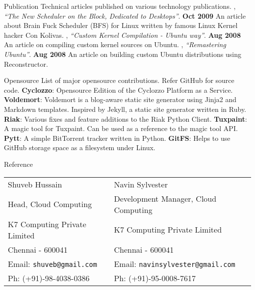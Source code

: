 \documentclass{resume}
\begin{document}

\begin{category}{Publication}
  \citemnobullet Technical articles published on various technology publications.
  , {\em ``The New Scheduler on the Block, Dedicated to Desktops''}. \hfill \textbf{Oct 2009}
  \citemnobullet An article about Brain Fuck Scheduler (BFS) for Linux written by famous Linux Kernel hacker Con Kolivas.
  , {\em ``Custom Kernel Compilation - Ubuntu way''}. \hfill \textbf{Aug 2008}
  \citemnobullet An article on compiling custom kernel sources on Ubuntu.
  , {\em ``Remastering Ubuntu''}. \hfill \textbf{Aug 2008}
  \citemnobullet An article on building custom Ubuntu distributions using Reconstructor.
\end{category}


\begin{category}{Opensource}
  \citemnobullet List of major opensource contributions. Refer GitHub for source code.
  \citembullet \textbf{Cyclozzo}: Opensource Edition of the Cyclozzo Platform as a Service.
  \citembullet \textbf{Voldemort}: Voldemort is a blog-aware static site generator using Jinja2 
  and Markdown templates. Inspired by Jekyll, a static site generator written in Ruby.
  \citembullet \textbf{Riak}: Various fixes and feature additions to the Riak Python Client.
  \citembullet \textbf{Tuxpaint}: A magic tool for Tuxpaint. Can be used as a reference to the magic tool API.
  \citembullet \textbf{Pytt}: A simple BitTorrent tracker written in Python.
  \citembullet \textbf{GitFS}: Helps to use GitHub storage space as a filesystem under Linux.
\end{category}


\begin{category}{Reference}
  \citemnobullet \\
  \begin{tabular}{ll}Shuveb Hussain&Navin Sylvester\\
    Head, Cloud Computing&Development Manager, Cloud Computing\\
    K7 Computing Private Limited&K7 Computing Private Limited\\
    Chennai - 600041&Chennai - 600041\\
    Email: \mbox{\small\tt shuveb@gmail.com}&Email: \mbox{\small\tt navinsylvester@gmail.com}\\
    Ph: (+91)-98-4038-0386&Ph: (+91)-95-0008-7617
  \end{tabular}
\end{category}
\end{document}

